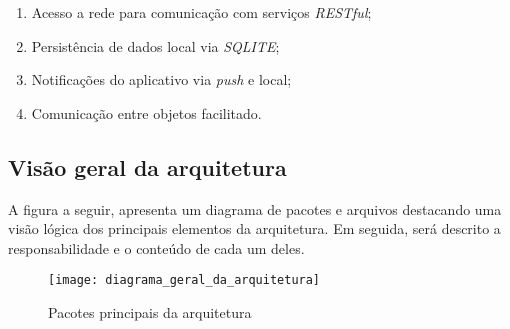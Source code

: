 \begin{enumerate}
	\item Acesso a rede para comunicação com serviços \textit{RESTful};
	\item Persistência de dados local via \textit{SQLITE};
	\item Notificações do aplicativo via \textit{push} e local;
	\item Comunicação entre objetos facilitado.
\end{enumerate}


\subsection{Visão geral da arquitetura}
A figura a seguir, apresenta um diagrama de pacotes e arquivos destacando uma visão lógica dos principais elementos da arquitetura. Em seguida, será descrito a responsabilidade e o conteúdo de cada um deles.

\begin{figure}[H]
	\texttt{[image: diagrama\_geral\_da\_arquitetura]}
	\centering
	\caption{Pacotes principais da arquitetura}
\end{figure}

